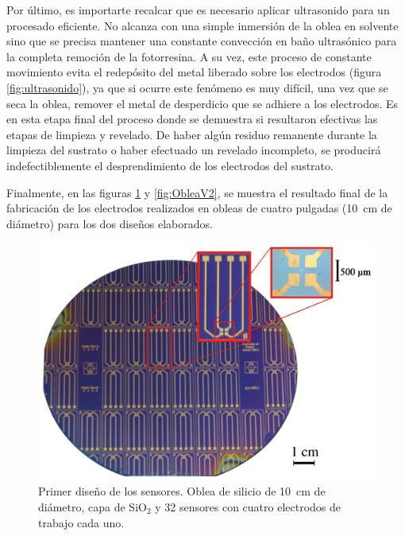 		 Por último, es importarte recalcar que es necesario aplicar ultrasonido para un procesado eficiente. No alcanza con una simple inmersión de la oblea en solvente sino que se precisa mantener una constante convección en baño ultrasónico para la completa remoción de la fotorresina. A su vez, este proceso de constante movimiento evita el redepósito del metal liberado sobre los electrodos (figura \ref{fig:ultrasonido}), ya que si ocurre este fenómeno es muy difícil, una vez que se seca la oblea, remover el metal de desperdicio que se adhiere a los electrodos. Es en esta etapa final del proceso donde se demuestra si resultaron efectivas las etapas de limpieza y revelado. De haber algún residuo remanente durante la limpieza del sustrato o haber efectuado un revelado incompleto, se producirá indefectiblemente el desprendimiento de los electrodos del sustrato.

		 Finalmente, en las figuras \ref{fig:ObleaV1} y \ref{fig:ObleaV2}, se muestra el resultado final de la fabricación de los electrodos realizados en obleas de cuatro pulgadas (\SI{10}{\cm} de diámetro) para los dos diseños elaborados.\pagebreak
		

		 			  \clearpage
					  \begin{figure}[ht!]
					  \begin{center}
					  \includegraphics[width=\textwidth]{Imagenes/ObleaV1.jpg}
					  \caption[Electrodos, primera versión]{Primer diseño de los sensores. Oblea de silicio de \SI{10}{cm} de diámetro, capa de SiO$_2$ y 32 sensores con cuatro electrodos de trabajo cada uno.}
					  \label{fig:ObleaV1}
					  \end{center}
					  \end{figure} 	

